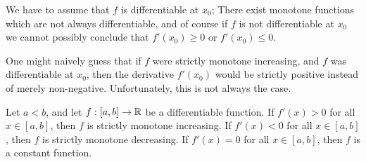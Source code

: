 \begin{rmk}\label{i:10.3.2}
  We have to assume that \(f\) is differentiable at \(x_0\);
  There exist monotone functions which are not always differentiable, and of course if \(f\) is not differentiable at \(x_0\) we cannot possibly conclude that \(f'(x_0) \geq 0\) or \(f'(x_0) \leq 0\).
\end{rmk}

\begin{note}
  One might naively guess that if \(f\) were strictly monotone increasing, and \(f\) was differentiable at \(x_0\), then the derivative \(f'(x_0)\) would be strictly positive instead of merely non-negative.
  Unfortunately, this is not always the case.
\end{note}

\begin{prop}\label{i:10.3.3}
  Let \(a < b\), and let \(f : [a, b] \to \mathbb{R}\) be a differentiable function.
  If \(f'(x) > 0\) for all \(x \in [a, b]\), then \(f\) is strictly monotone increasing.
  If \(f'(x) < 0\) for all \(x \in [a, b]\), then \(f\) is strictly monotone decreasing.
  If \(f'(x) = 0\) for all \(x \in [a, b]\), then \(f\) is a constant function.
\end{prop}

